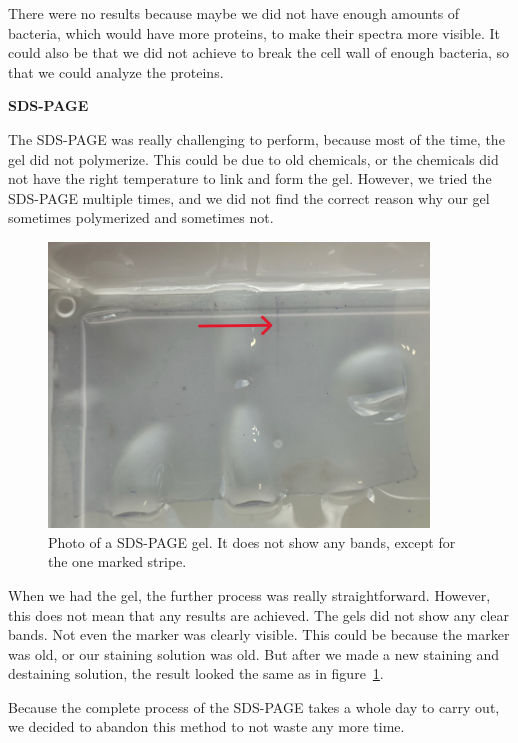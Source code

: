 There were no results because maybe we did not have enough amounts of bacteria, which would have more proteins, to make their spectra more visible.
It could also be that we did not achieve to break the cell wall of enough bacteria, so that we could analyze the proteins.

\textbf{SDS-PAGE}

The SDS-PAGE was really challenging to perform, because most of the time, the gel did not polymerize.
This could be due to old chemicals, or the chemicals did not have the right temperature to link and form the gel.
However, we tried the SDS-PAGE multiple times, and we did not find the correct reason why our gel sometimes polymerized and sometimes not.

\begin{figure}[H]
    \centering
    \includegraphics[width=0.9\textwidth]{./media/images/sdspage}
    \caption{Photo of a SDS-PAGE gel. It does not show any bands, except for the one marked stripe.}
    \label{fig:sds_page_result}
\end{figure}

When we had the gel, the further process was really straightforward.
However, this does not mean that any results are achieved.
The gels did not show any clear bands.
Not even the marker was clearly visible.
This could be because the marker was old, or our staining solution was old.
But after we made a new staining and destaining solution, the result looked the same as in figure~\ref{fig:sds_page_result}.

Because the complete process of the SDS-PAGE takes a whole day to carry out, we decided to abandon this method to not waste any more time.

